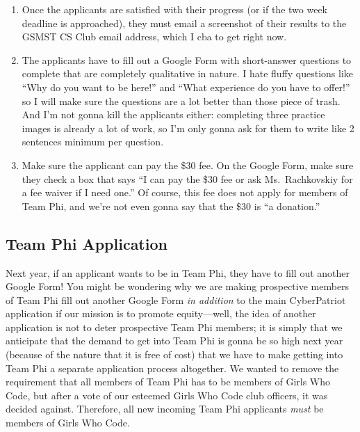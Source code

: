 \documentclass[
  letterpaper,
  DIV=11,
  numbers=noendperiod]{scrartcl}
\providecommand{\tightlist}{%
  \setlength{\itemsep}{0pt}\setlength{\parskip}{0pt}}\usepackage{longtable,booktabs,array}
\begin{document}
\begin{enumerate}
\def\labelenumi{\arabic{enumi})}
\setcounter{enumi}{1}
\tightlist
\item
  Once the applicants are satisfied with their progress (or if the two
  week deadline is approached), they must email a screenshot of their
  results to the GSMST CS Club email address, which I cba to get right
  now.\\
\item
  The applicants have to fill out a Google Form with short-answer
  questions to complete that are completely qualitative in nature. I
  hate fluffy questions like ``Why do you want to be here!'' and ``What
  experience do you have to offer!'' so I will make sure the questions
  are a lot better than those piece of trash. And I'm not gonna kill the
  applicants either: completing three practice images is already a lot
  of work, so I'm only gonna ask for them to write like 2 sentences
  minimum per question.\\
\item
  Make sure the applicant can pay the \$30 fee. On the Google Form, make
  sure they check a box that says ``I can pay the \$30 fee or ask
  Ms.~Rachkovskiy for a fee waiver if I need one.'' Of course, this fee
  does not apply for members of Team Phi, and we're not even gonna say
  that the \$30 is ``a donation.''
\end{enumerate}

\hypertarget{team-phi-application}{%
\subsection{Team Phi Application}\label{team-phi-application}}

Next year, if an applicant wants to be in Team Phi, they have to fill
out another Google Form! You might be wondering why we are making
prospective members of Team Phi fill out another Google Form \emph{in
addition} to the main CyberPatriot application if our mission is to
promote equity---well, the idea of another application is not to deter
prospective Team Phi members; it is simply that we anticipate that the
demand to get into Team Phi is gonna be so high next year (because of
the nature that it is free of cost) that we have to make getting into
Team Phi a separate application process altogether. We wanted to
remove the requirement that all members of Team Phi has to be members of
Girls Who Code, but after a vote of our esteemed Girls Who Code club officers, it was decided against. Therefore, all new incoming Team Phi applicants \textit{must} be members of Girls Who Code.
\end{document}
